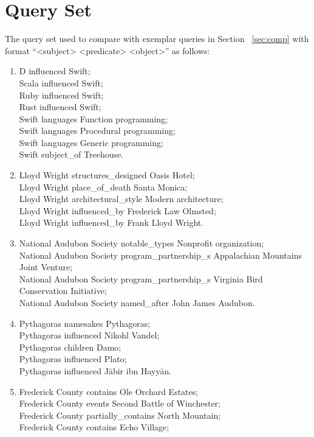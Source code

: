 \documentclass{sigmod}
\begin{document}
\section{Query Set}
The query set used to compare with exemplar queries in Section ~\ref{sec:comp} with format ``<subject> <predicate> <object>'' as follows:
\begin{enumerate}
\item D influenced Swift;\\
Scala influenced Swift;\\
Ruby influenced Swift;\\
Rust influenced Swift;\\
Swift languages Function programming;\\
Swift languages Procedural programming;\\
Swift languages Generic programming;\\
Swift subject\_of Treehouse.
\item Lloyd Wright structures\_designed Oasis Hotel;\\
Lloyd Wright place\_of\_death Santa Monica;\\
Lloyd Wright architectural\_style Modern architecture;\\
Lloyd Wright influenced\_by Frederick Law Olmsted;\\
Lloyd Wright influenced\_by Frank Lloyd Wright.
\item National Audubon Society notable\_types Nonprofit organization;\\
National Audubon Society program\_partnership\_s Appalachian Mountains Joint Venture;\\
National Audubon Society program\_partnership\_s Virginia Bird Conservation Initiative;\\
National Audubon Society named\_after John James Audubon.
\item Pythagoras namesakes Pythagoras;\\
Pythagoras influenced Nikohl Vandel;\\
Pythagoras children Damo;\\
Pythagoras influenced Plato;\\
Pythagoras influenced Jābir ibn Hayyān.
\item Frederick County contains Ole Orchard Estates;\\
Frederick County events Second Battle of Winchester;\\
Frederick County partially\_contains North Mountain;\\
Frederick County contains Echo Village;\\

\end{enumerate}
\end{document}
